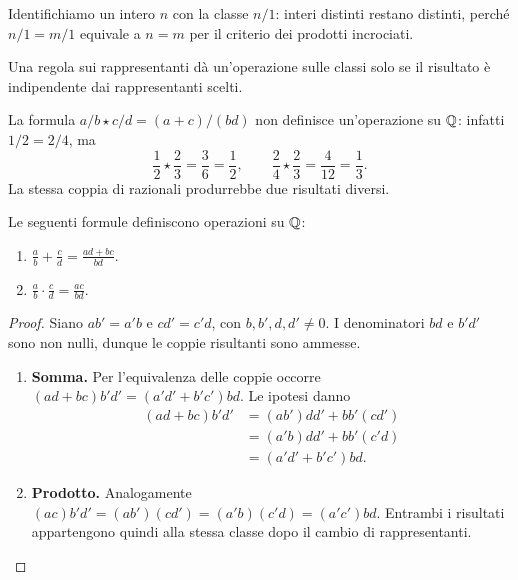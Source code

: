 Identifichiamo un intero $n$ con la classe $n/1$: interi distinti restano distinti, perché $n/1=m/1$ equivale a $n=m$ per il criterio dei prodotti incrociati.

Una regola sui rappresentanti dà un'operazione sulle classi solo se il risultato è indipendente dai rappresentanti scelti.

\begin{esempio}
La formula $a/b\star c/d=(a+c)/(bd)$ non definisce un'operazione su $\mathbb{Q}$: infatti $1/2=2/4$, ma
\[
\frac12\star\frac23=\frac36=\frac12,\qquad
\frac24\star\frac23=\frac4{12}=\frac13.
\]
La stessa coppia di razionali produrrebbe due risultati diversi.
\end{esempio}

\begin{proposizione}
Le seguenti formule definiscono operazioni su $\mathbb{Q}$:
\begin{enumerate}[label=\arabic*.]
\item $\displaystyle\frac ab+\frac cd=\frac{ad+bc}{bd}$.
\item $\displaystyle\frac ab\cdot\frac cd=\frac{ac}{bd}$.
\end{enumerate}
\end{proposizione}
\begin{proof}
Siano $ab'=a'b$ e $cd'=c'd$, con $b,b',d,d'\ne0$. I denominatori $bd$ e $b'd'$ sono non nulli, dunque le coppie risultanti sono ammesse.

\begin{enumerate}[label=\arabic*.]
\item \textbf{Somma.} Per l'equivalenza delle coppie occorre $(ad+bc)b'd'=(a'd'+b'c')bd$. Le ipotesi danno
\[
\begin{aligned}
(ad+bc)b'd'&=(ab')dd'+bb'(cd')\\
&=(a'b)dd'+bb'(c'd)\\
&=(a'd'+b'c')bd.
\end{aligned}
\]
\item \textbf{Prodotto.} Analogamente $(ac)b'd'=(ab')(cd')=(a'b)(c'd)=(a'c')bd$. Entrambi i risultati appartengono quindi alla stessa classe dopo il cambio di rappresentanti.
\end{enumerate}
\end{proof}

